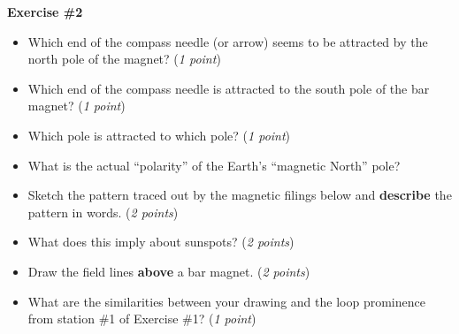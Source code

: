 \documentclass[notitlepage]{article}
\begin{document}
 
 \large{\bf Exercise \#2}
 \begin{itemize}
  \item Which end of the compass needle (or arrow) seems to be attracted by the north pole of the magnet? ({\it 1 point})
  \vspace{2cm}
  \item Which end of the compass needle is attracted to the south pole of the bar magnet? ({\it 1 point})
  \vspace{2cm}
  \item Which pole is attracted to which pole? ({\it 1 point})
  \vspace{2cm}
  \item What is the actual ``polarity'' of the Earth's ``magnetic North'' pole?
  \vspace{2cm}
  \item Sketch the pattern traced out by the magnetic filings below and \textbf{describe} the pattern in words. ({\it 2 points})
  \vspace{7cm}
  \item What does this imply about sunspots? ({\it 2 points})
  \vspace{3cm}
  \item Draw the field lines \textbf{above} a bar magnet. ({\it 2 points})
  \vspace{7cm}
  \item What are the similarities between your drawing and the loop prominence from station \#1 of Exercise \#1? ({\it 1 point})
  \vspace{3cm}
 \end{itemize}
 
 


 
 
 
 
 
 
 
\end{document}
